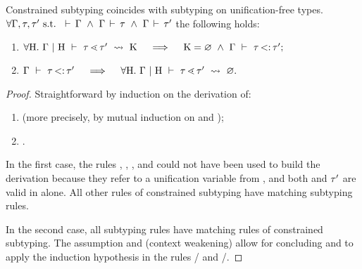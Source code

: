 \begin{lemma}{Constrained subtyping coincides with subtyping on
    unification-free types.}%
\label{lem:subtyctr-subty}
    $\forall \AEnv, \ty, \ty' \text{ s.t. } 
    \tyvld{}{\AEnv} \ \land\ \tyvlddflt{\ty} \ \land\ \tyvlddflt{\ty'}$ 
    the following holds:
    \begin{enumerate}
        \item $\forall \UEnvD.\ \subtyctrdflt{\ty}{\ty'} \quad\implies\quad
            \CSet = \EmptyCSet\ \land\ \subtydflt{\ty}{\ty'};$
        \item $\subtydflt{\ty}{\ty'} \quad\implies\quad 
            \forall \UEnvD.\ \subtyctrdfltenv{\ty}{\ty'}{\EmptyCSet}.$
    \end{enumerate}
\end{lemma}
\begin{proof}
    Straightforward by induction on the derivation of:
    \begin{enumerate}
        \item {} (more precisely, by mutual induction
            on  and );
        \item {}.
    \end{enumerate}

    In the first case, the rules , , ,
    and  could not have been used to build the derivation
    because they refer to a unification variable \va from \UEnvD,
    and both \ty and $\tau'$ are valid in \AEnv alone.
    All other rules of constrained subtyping have matching subtyping rules.

    In the second case, all subtyping rules have matching rules of constrained
    subtyping.
    The assumption \tyvld{}{\AEnv} and  (context
    weakening) allow for concluding 
    \tyvlddflt{\plug\dctx\tyub} and \tyvlddflt{\tylb} 
    to apply the induction hypothesis in the rules
    / and /.
\end{proof}

